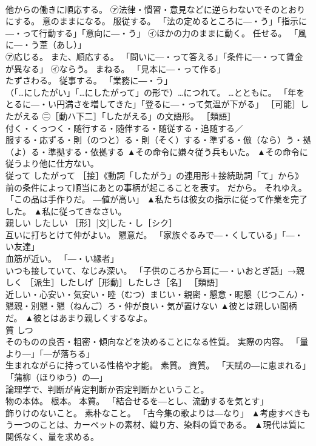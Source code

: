 \documentclass[8pt]{extreport}
\begin{document}
\begin{CJK}{UTF8}{min}
\\	他からの働きに順応する。 ㋐法律・慣習・意見などに逆らわないでそのとおりにする。 意のままになる。 服従する。 「法の定めるところに―・う」「指示に―・って行動する」「意向に―・う」 ㋑ほかの力のままに動く。 任せる。 「風に―・う葦（あし）」 
\\	㋐応じる。 また、順応する。 「問いに―・って答える」「条件に―・って賃金が異なる」 ㋑ならう。 まねる。 「見本に―・って作る」 
\\	たずさわる。 従事する。 「業務に―・う」 
\\	（「…にしたがい」「…にしたがって」の形で）…につれて。 …とともに。 「年をとるに―・い円満さを増してきた」「登るに―・って気温が下がる」 ［可能］したがえる ㊁［動ハ下二］「したがえる」の文語形。 ［類語］ 
\\	付く・くっつく・随行する・随伴する・随従する・追随する／
\\	服する・応ずる・則（のつと）る・則（そく）する・準ずる・倣（なら）う・拠（よ）る・準拠する・依拠する	▲その命令に嫌々従う兵もいた。 ▲その命令に従うより他に仕方ない。
\\	従って	したがって	［接］《動詞「したがう」の連用形＋接続助詞「て」から》前の条件によって順当にあとの事柄が起こることを表す。 だから。 それゆえ。 「この品は手作りだ。 ―値が高い」	▲私たちは彼女の指示に従って作業を完了した。 ▲私に従ってきなさい。
\\	親しい	したしい	［形］[文]した・し［シク］ 
\\	互いに打ちとけて仲がよい。 懇意だ。 「家族ぐるみで―・くしている」「―・い友達」 
\\	血筋が近い。 「―・い縁者」 
\\	いつも接していて、なじみ深い。 「子供のころから耳に―・いおとぎ話」→親しく ［派生］したしげ［形動］したしさ［名］ ［類語］
\\	近しい・心安い・気安い・睦（むつ）まじい・親密・懇意・昵懇（じつこん）・懇親・別懇・懇（ねんご）ろ・仲が良い・気が置けない	▲彼とは親しい間柄だ。 ▲彼とはあまり親しくするなよ。
\\	質	しつ	
\\	そのものの良否・粗密・傾向などを決めることになる性質。 実際の内容。 「量より―」「―が落ちる」 
\\	生まれながらに持っている性格や才能。 素質。 資質。 「天賦の―に恵まれる」「蒲柳（ほりゆう）の―」 
\\	論理学で、判断が肯定判断か否定判断かということ。 
\\	物の本体。 根本。 本質。 「結合せるを―とし、流動するを気とす」 
\\	飾りけのないこと。 素朴なこと。 「古今集の歌よりは―なり」	▲考慮すべきもう一つのことは、カーペットの素材、織り方、染料の質である。 ▲現代は質に関係なく、量を求める。

\end{CJK}
\end{document}
